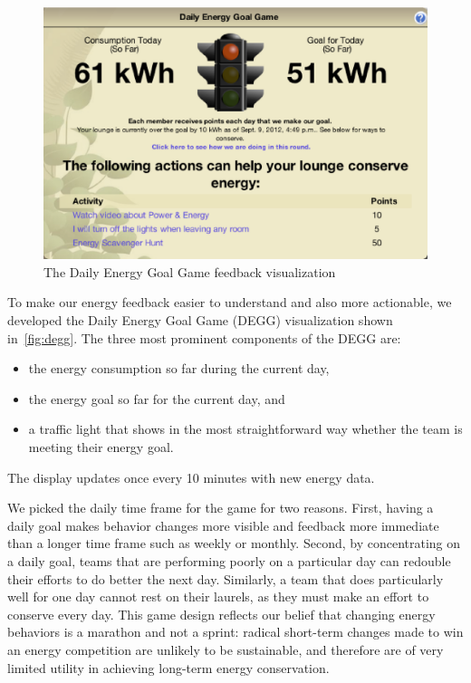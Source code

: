 \documentclass[10pt, conference, compsocconf]{IEEEtran-old}
\begin{document}
\begin{figure}[!tb]
	\centering
	\includegraphics[width=\columnwidth]{degg.eps}
	\caption{The Daily Energy Goal Game feedback visualization}
	\label{fig:degg}
\end{figure}

To make our energy feedback easier to understand and also more actionable, we developed the Daily Energy Goal Game (DEGG) visualization shown in~\autoref{fig:degg}. The three most prominent components of the DEGG are:
\begin{itemize}
	\item the energy consumption so far during the current day,
	\item the energy goal so far for the current day, and
	\item a traffic light that shows in the most straightforward way whether the team is meeting their energy goal.
\end{itemize}
The display updates once every 10 minutes with new energy data.

We picked the daily time frame for the game for two reasons. First, having a daily goal makes behavior changes more visible and feedback more immediate than a longer time frame such as weekly or monthly. Second, by concentrating on a daily goal, teams that are performing poorly on a particular day can redouble their efforts to do better the next day. Similarly, a team that does particularly well for one day cannot rest on their laurels, as they must make an effort to conserve every day. This game design reflects our belief that changing energy behaviors is a marathon and not a sprint: radical short-term changes made to win an energy competition are unlikely to be sustainable, and therefore are of very limited utility in achieving long-term energy conservation.
\end{document}
